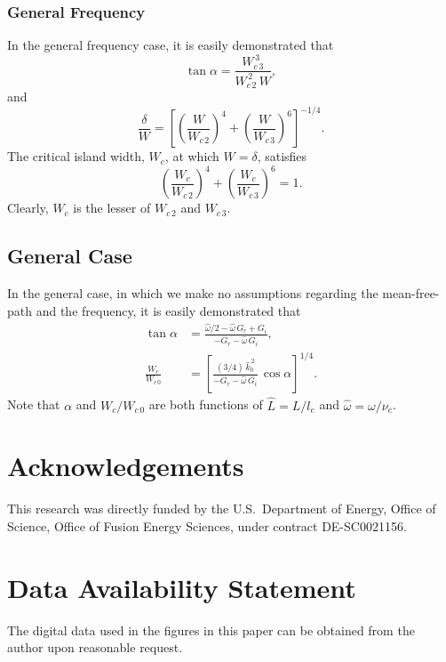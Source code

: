 \documentclass[12pt,prb,aps]{revtex4-1}
\begin{document}
\subsubsection{General Frequency}
In the general frequency case, it is easily demonstrated that
\begin{equation}
\tan\alpha  = \frac{W_{c\,3}^{\,3}}{W_{c\,2}^{\,2}\,W},
\end{equation}
and
\begin{equation}
\frac{\delta}{W} = \left[\left(\frac{W}{W_{c\,2}}\right)^4 + \left(\frac{W}{W_{c\,3}}\right)^6\right]^{-1/4}.
\end{equation}
The critical island width, $W_c$,  at which $W=\delta$, satisfies
\begin{equation}
\left(\frac{W_c}{W_{c\,2}}\right)^4 + \left(\frac{W_c}{W_{c\,3}}\right)^6= 1.
\end{equation}
Clearly, $W_c$ is the lesser of $W_{c\,2}$ and $W_{c\,3}$. 

\subsection{General Case}
In the general case, in which we make no assumptions regarding the mean-free-path and the frequency, it is easily demonstrated that
\begin{align}
\tan\alpha& = \frac{\hat{\omega}/2 -\hat{\omega}\,G_r + G_i}{-G_r-\hat{\omega}\,G_i},\\[0.5ex]
\frac{W_c}{W_{c\,0}} &= \left[\frac{(3/4)\,\hat{k}_0^{\,2}}{-G_r-\hat{\omega}\,G_i}\,\cos\alpha\right]^{1/4}.
\end{align}
Note that $\alpha$ and $W_c/W_{c\,0}$ are both functions of $\hat{L}=L/l_e$ and $\hat{\omega}=\omega/\nu_e$. 

\section*{Acknowledgements}
This research was directly funded by the U.S.\ Department of Energy, Office of Science, Office of Fusion Energy Sciences, under  contract DE-SC0021156. 

\section*{Data Availability Statement}
The digital data used in the figures in this paper can be obtained from the author upon reasonable request.
\end{document}
